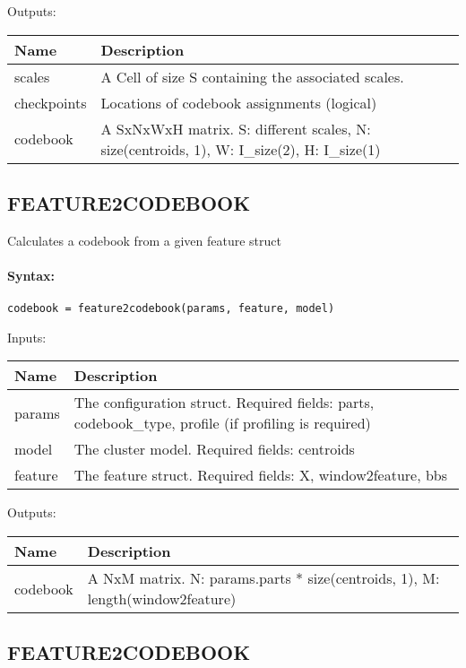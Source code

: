 \bigskip
Outputs:

\begin{tabular}{|p{}|p{}|}
\hline
\textbf{Name} & \textbf{Description} \\
\hline \hline
scales & A Cell of size S containing the associated scales.  \\ \hline
checkpoints & Locations of codebook assignments (logical)  \\ \hline
codebook & A SxNxWxH matrix. S: different scales, N: size(centroids, 1), W: I\_size(2), H: I\_size(1)  \\ \hline
\end{tabular}

\subsection{FEATURE2CODEBOOK}

Calculates a codebook from a given feature struct

\paragraph{Syntax:} \verb|codebook = feature2codebook(params, feature, model)|

\bigskip
Inputs:

\begin{tabular}{|p{}|p{}|}
\hline
\textbf{Name} & \textbf{Description} \\
\hline \hline
params & The configuration struct. Required fields: parts, codebook\_type, profile (if profiling is required)  \\ \hline
model & The cluster model. Required fields: centroids  \\ \hline
feature & The feature struct. Required fields: X, window2feature, bbs  \\ \hline
\end{tabular}

\bigskip
Outputs:

\begin{tabular}{|p{}|p{}|}
\hline
\textbf{Name} & \textbf{Description} \\
\hline \hline
codebook & A NxM matrix. N: params.parts * size(centroids, 1), M: length(window2feature)  \\ \hline
\end{tabular}

\subsection{FEATURE2CODEBOOK}

